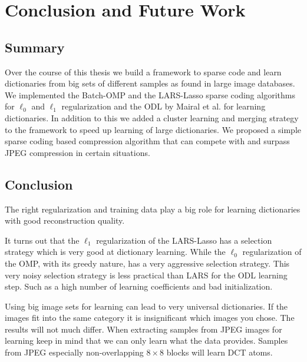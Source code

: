 \chapter{Conclusion and Future Work}

\section{Summary}
Over the course of this thesis we build a framework to sparse code and learn
dictionaries from big sets of different samples as found in large image
databases. We implemented the Batch-OMP and the LARS-Lasso sparse coding
algorithms for $\ell_0$ and $\ell_1$ regularization and the ODL by Mairal et
al. for learning dictionaries. 
In addition to this we added a cluster learning and merging strategy to the
framework to speed up learning of large dictionaries. We proposed a simple
sparse coding based compression algorithm that can compete with and surpass JPEG
compression in certain situations.


\section{Conclusion}
The right regularization and training data play a big role for learning 
dictionaries with good reconstruction quality. 

It turns out that the $\ell_1$ regularization of the LARS-Lasso has a selection
strategy which is very good at dictionary learning.
While the $\ell_0$ regularization of the OMP, with its greedy nature, has a very
aggressive selection strategy. This very noisy selection strategy is less
practical than LARS for the ODL learning step. Such as a high number of learning
coefficients and bad initialization. 


Using big image sets for learning can lead to very universal dictionaries. If
the images fit into the same category it is insignificant which images you
chose. The results will not much differ. When extracting samples from JPEG
images for learning keep in mind that we can only learn what the data provides.
Samples from JPEG especially non-overlapping $8 \times 8$ blocks will learn DCT
atoms.


